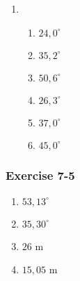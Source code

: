 {\begin{multicols}{3}
\begin{enumerate}[noitemsep, label=\textbf{\arabic*}. ]
\item %
    \begin{enumerate}[noitemsep, label=\textbf{(\alph*)} ]
\item $24,0^{\circ}$
\item $35,2^{\circ}$
\item $50,6^{\circ}$
\item $26,3^{\circ}$
\item $37,0^{\circ}$
\item $45,0^{\circ}$
      \end{enumerate}
\end{enumerate}
\subsubsection*{Exercise 7-5} %
\begin{enumerate}[noitemsep, label=\textbf{\arabic*}. ] 

\item $53,13^{\circ}$%
\item $35,30^{\circ}$%
\item $26$ m%
\item $15,05$ m %

\end{enumerate}

    


\end{multicols}}

